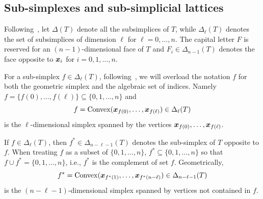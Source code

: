 \documentclass[mathpazo]{cicp}
\begin{document}
\subsection{Sub-simplexes and sub-simplicial lattices}
Following~\cite{ArnoldFalkWinther2009}, let $\Delta(T)$ denote all the subsimplices of $T$, while $\Delta_{\ell}(T)$ denotes the set of subsimplices of dimension $\ell$ for $\ell=0,\ldots, n$. 
The capital letter $F$ is reserved for an $(n-1)$-dimensional face of $T$ and $F_i\in\Delta_{n-1}(T)$ denotes the face opposite to ${\boldsymbol x}_i$ for $i=0,1,\ldots, n$.

For a sub-simplex $f\in \Delta_{\ell}(T)$, following~\cite{Chen;Huang:2022FEMcomplex3D}, we will overload the notation $f$ for both the geometric simplex and the algebraic set of indices. Namely $f = \{f(0), \ldots, f(\ell)\}\subseteq \{0, 1, \ldots, n\}$ and 
$$
f ={\rm Convex}({\boldsymbol x}_{f(0)}, \ldots, {\boldsymbol x}_{f(\ell)}) \in \Delta_{\ell}(T)
$$
is the $\ell$-dimensional simplex spanned by the vertices ${\boldsymbol x}_{f(0)}, \ldots, {\boldsymbol x}_{f( \ell)}$.

If $f \in \Delta_{\ell}(T)$, then $f^{*} \in \Delta_{n- \ell-1}(T)$ denotes the sub-simplex of $T$ opposite to $f$. When treating $f$ as a subset of $\{0, 1, \ldots, n\}$, $f^*\subseteq \{0,1, \ldots, n\}$ so that $f\cup f^* = \{0, 1, \ldots, n\}$, i.e., $f^*$ is the complement of set $f$. Geometrically,
$$
f^* ={\rm Convex}({\boldsymbol x}_{f^*(1)}, \ldots, {\boldsymbol x}_{f^*(n-\ell)}) \in \Delta_{n- \ell-1}(T)
$$
is the $(n- \ell-1)$-dimensional simplex spanned by vertices not contained in $f$. 
\end{document}
